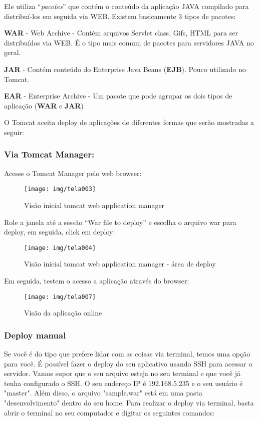 Ele utiliza “\emph{pacotes}” que contém o conteúdo da aplicação JAVA compilado para distribuí-los em seguida via WEB. Existem basicamente 3 tipos de pacotes:

\textbf{WAR} - Web Archive - Contém arquivos Servlet class, Gifs, HTML para ser distribuídos via WEB. É o tipo mais comum de pacotes para servidores JAVA no geral.

\textbf{JAR} - Contém conteúdo do Enterprise Java Beans (\textbf{EJB}). Pouco utilizado no Tomcat.

\textbf{EAR} - Enterprise Archive - Um pacote que pode agrupar os dois tipos de aplicação (\textbf{WAR} e \textbf{JAR})

\newpage
O Tomcat aceita deploy de aplicações de diferentes formas que serão mostradas a seguir: 


\subsubsection{Via Tomcat Manager:}

Acesse o Tomcat Manager pelo web browser:

\begin{figure}[H]
	\centering
	\caption[Tela Application Mangager]{Visão inicial tomcat web application manager}
	\texttt{[image: img/tela003]}
	\label{fig:tomcat-tela-appmanager}
\end{figure}

Role a janela até a sessão “War file to deploy” e escolha o arquivo war para deploy, em seguida, click em deploy:

\begin{figure}[H]
	\centering
	\caption[Tela Application Mangager - Deploy]{Visão inicial tomcat web application manager - área de deploy}
	\texttt{[image: img/tela004]}
	\label{fig:tomcat-tela-deploy}
\end{figure}

\newpage
Em seguida, testem o acesso a aplicação através do browser:
\begin{figure}[H]
	\centering
	\caption[sample.war]{Visão da aplicação online}
	\texttt{[image: img/tela007]}
	\label{fig:showapp}
\end{figure}
\subsubsection{Deploy manual}

Se você é do tipo que prefere lidar com as coisas via terminal, temos uma opção para você. É possível fazer o deploy do seu aplicativo usando SSH para acessar o servidor. Vamos supor que o seu arquivo esteja no seu terminal e que você já tenha configurado o SSH. O seu endereço IP é 192.168.5.235 e o seu usuário é "master". Além disso, o arquivo "sample.war" está em uma pasta "desenvolvimento" dentro do seu home. Para realizar o deploy via terminal, basta abrir o terminal no seu computador e digitar os seguintes comandos:

